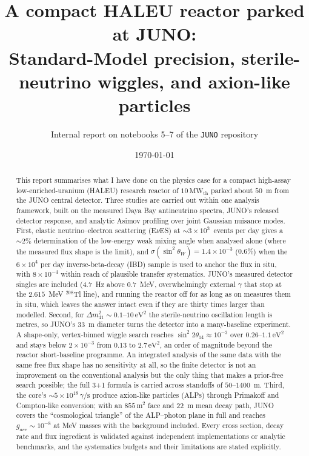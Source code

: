 \documentclass[aps,prd,superscriptaddress,nofootinbib,longbibliography,notitlepage,11pt]{revtex4-2}
\newcommand{\eves}{E$\nu$ES}
\newcommand{\sw}{\sin^2\theta_W}
\newcommand{\dm}[1]{\Delta m^2_{#1}}
\newcommand{\st}[1]{\sin^2 2\theta_{#1}}
\begin{document}
\title{A compact HALEU reactor parked at JUNO:\\
Standard-Model precision, sterile-neutrino wiggles, and axion-like particles}
\author{Internal report on notebooks 5--7 of the \texttt{JUNO} repository}
\date{\today}
\begin{abstract}
This report summarises what I have done on the physics case for a compact
high-assay low-enriched-uranium (HALEU) research reactor of $10\,\mathrm{MW_{th}}$ parked
about $50$~m from the JUNO central detector.  Three studies are carried out within one
analysis framework, built on the measured Daya Bay antineutrino spectra, JUNO's released
detector response, and analytic Asimov profiling over joint Gaussian nuisance modes.
First, elastic neutrino--electron scattering (\eves) at $\sim3\times10^3$~events per day
gives a $\sim2\%$ determination of the low-energy weak mixing angle when analysed alone
(where the measured flux shape is the limit), and $\sigma(\sw)=1.4\times10^{-3}$
($0.6\%$) when the $6\times10^4$ per day inverse-beta-decay (IBD) sample is used to anchor
the flux in situ, with $8\times10^{-4}$ within reach of plausible transfer systematics.
JUNO's measured detector singles are included ($4.7$~Hz above $0.7$~MeV, overwhelmingly
external $\gamma$ that stop at the $2.615$~MeV $^{208}$Tl line), and running the
reactor off for as long as on measures them in situ, which leaves the answer intact even
if they are thirty times larger than modelled.
Second, for $\dm{41}\sim0.1$--$10\,\mathrm{eV^2}$ the sterile-neutrino oscillation length is
metres, so JUNO's 33~m diameter turns the detector into a many-baseline experiment.  A
shape-only, vertex-binned wiggle search reaches $\st{14}\approx10^{-3}$ over
$0.26$--$1.1\,\mathrm{eV^2}$ and stays below $2\times10^{-3}$ from $0.13$ to
$2.7\,\mathrm{eV^2}$, an order of magnitude beyond the reactor short-baseline programme.
An integrated analysis of the same data with the same free flux shape has no sensitivity
at all, so the finite detector is not an improvement on the conventional analysis but the
only thing that makes a prior-free search possible; the full 3+1 formula is carried across
standoffs of $50$--$1400$~m.  Third, the core's
$\sim5\times10^{18}\,\gamma/\mathrm{s}$ produce axion-like particles (ALPs) through
Primakoff and Compton-like conversion; with an $855\,\mathrm{m^2}$ face and 22~m mean decay
path, JUNO covers the ``cosmological triangle'' of the ALP--photon plane in full and reaches
$g_{aee}\sim10^{-8}$ at MeV masses with the background included.  Every cross section,
decay rate and flux ingredient is validated against independent implementations or analytic
benchmarks, and the systematics budgets and their limitations are stated explicitly.
\end{abstract}
\maketitle
\tableofcontents
\end{document}
